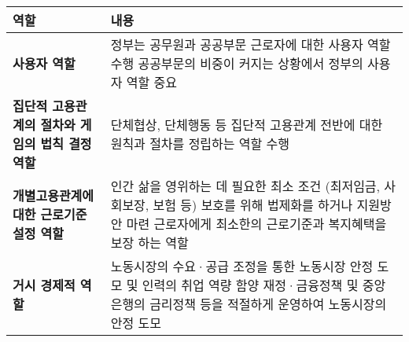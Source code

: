 \begin{tabular}{p{4cm}|p{8cm}}  %
\toprule
\textbf{역할} & \textbf{내용} \\ \midrule
\textbf{사용자 역할} & 정부는 공무원과 공공부문 근로자에 대한 사용자 역할 수행 \newline 공공부문의 비중이 커지는 상황에서 정부의 사용자 역할 중요 \\ \hline
\textbf{집단적 고용관계의 절차와 게임의 법칙 결정 역할} & 단체협상, 단체행동 등 집단적 고용관계 전반에 대한 원칙과 절차를 정립하는 역할 수행 \\ \hline
\textbf{개별고용관계에 대한 근로기준 설정 역할} & 인간 삶을 영위하는 데 필요한 최소 조건 (최저임금, 사회보장, 보험 등) 보호를 위해 법제화를 하거나 지원방안 마련 \newline 근로자에게 최소한의 근로기준과 복지혜택을 보장 하는 역할 \\ \hline
\textbf{거시 경제적 역할} & 노동시장의 수요·공급 조정을 통한 노동시장 안정 도모 및 인력의 취업 역량 함양 \newline 재정·금융정책 및 중앙은행의 금리정책 등을 적절하게 운영하여 노동시장의 안정 도모\\ \bottomrule
\end{tabular}
